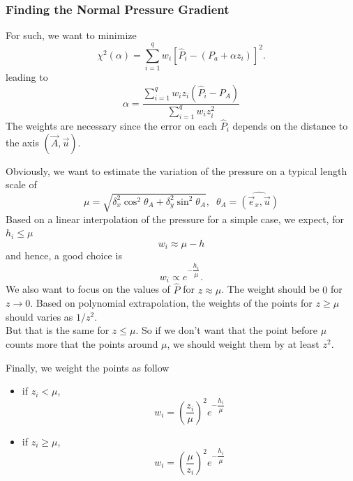 \documentclass[aps]{revtex4}
\begin{document}
\subsubsection{Finding the Normal Pressure Gradient}
For such, we want to minimize
$$
	\chi^2(\alpha) = \sum_{i=1}^q w_i \left\lbrack \hat{P}_i -\left(P_a+\alpha z_i\right)\right\rbrack^2.
$$
leading to
$$
	\alpha = \dfrac{\displaystyle \sum_{i=1}^q w_i z_i\left(\hat{P}_i-P_A\right)}{\displaystyle \sum_{i=1}^q w_i z_i^2}
$$
The weights are necessary since the error on each $\hat{P}_i$ depends on the distance to the axis $(\vec{A},\vec{u})$.

Obviously, we want to estimate the variation of the pressure on a typical length scale of 
$$
	\mu = \sqrt{\delta_x^2\cos^2\theta_A+\delta_y^2\sin^2\theta_A},\;\;\theta_A = \widehat{\left(\vec{e}_x,\vec{u}\right)}
$$
Based on a linear interpolation of the pressure for a simple case, we expect, for $h_i\leq\mu$
$$
	w_i \approx \mu -h 
$$
and hence, a good choice is
$$
	w_i \propto e^{-\dfrac{h_i}{\mu}}.
$$
We also want to focus on the values of $\hat{P}$ for $z\approx\mu$.
The weight should be $0$ for $z\to0$.
Based on polynomial extrapolation, the weights of the points for $z\geq\mu$ should varies as $1/z^2$.\\
But that is the same for $z\leq \mu$.
So if we don't want that the point before $\mu$ counts more that the points around $\mu$, we should weight them
by at least $z^2$.

Finally, we weight the points as follow
\begin{itemize}
\item if $z_i<\mu$, 
$$
	w_i = \left(\dfrac{z_i}{\mu}\right)^2 e^{-\dfrac{h_i}{\mu}}
$$
\item if $z_i\geq\mu$, 
$$
	w_i = \left(\dfrac{\mu}{z_i}\right)^2 	e^{-\dfrac{h_i}{\mu}}
$$
\end{itemize}
\end{document}
